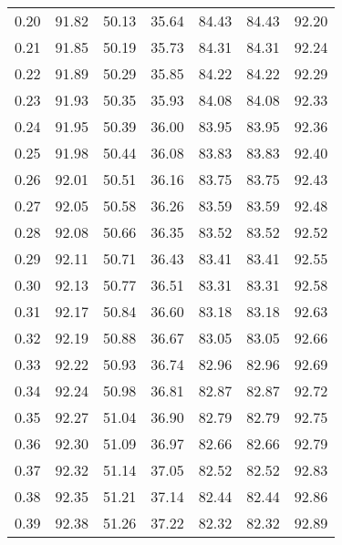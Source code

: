\begin{tabular}{|c|c|c|c|c|c|c|}
      0.20 &     91.82 &     50.13 &      35.64 &   84.43 &      84.43 &         92.20 \\
      0.21 &     91.85 &     50.19 &      35.73 &   84.31 &      84.31 &         92.24 \\
      0.22 &     91.89 &     50.29 &      35.85 &   84.22 &      84.22 &         92.29 \\
      0.23 &     91.93 &     50.35 &      35.93 &   84.08 &      84.08 &         92.33 \\
      0.24 &     91.95 &     50.39 &      36.00 &   83.95 &      83.95 &         92.36 \\
      0.25 &     91.98 &     50.44 &      36.08 &   83.83 &      83.83 &         92.40 \\
      0.26 &     92.01 &     50.51 &      36.16 &   83.75 &      83.75 &         92.43 \\
      0.27 &     92.05 &     50.58 &      36.26 &   83.59 &      83.59 &         92.48 \\
      0.28 &     92.08 &     50.66 &      36.35 &   83.52 &      83.52 &         92.52 \\
      0.29 &     92.11 &     50.71 &      36.43 &   83.41 &      83.41 &         92.55 \\
      0.30 &     92.13 &     50.77 &      36.51 &   83.31 &      83.31 &         92.58 \\
      0.31 &     92.17 &     50.84 &      36.60 &   83.18 &      83.18 &         92.63 \\
      0.32 &     92.19 &     50.88 &      36.67 &   83.05 &      83.05 &         92.66 \\
      0.33 &     92.22 &     50.93 &      36.74 &   82.96 &      82.96 &         92.69 \\
      0.34 &     92.24 &     50.98 &      36.81 &   82.87 &      82.87 &         92.72 \\
      0.35 &     92.27 &     51.04 &      36.90 &   82.79 &      82.79 &         92.75 \\
      0.36 &     92.30 &     51.09 &      36.97 &   82.66 &      82.66 &         92.79 \\
      0.37 &     92.32 &     51.14 &      37.05 &   82.52 &      82.52 &         92.83 \\
      0.38 &     92.35 &     51.21 &      37.14 &   82.44 &      82.44 &         92.86 \\
      0.39 &     92.38 &     51.26 &      37.22 &   82.32 &      82.32 &         92.89 \\

\end{tabular}
